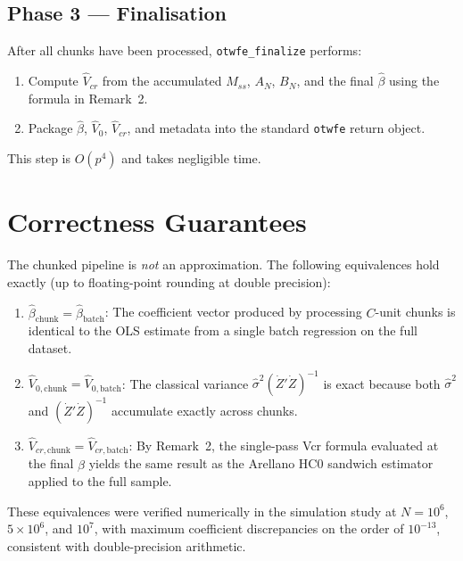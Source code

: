 \documentclass[11pt, a4paper]{article}
\begin{document}
\subsection{Phase 3 --- Finalisation}

After all chunks have been processed, \texttt{otwfe\_finalize} performs:
\begin{enumerate}
  \item Compute $\hat{V}_{cr}$ from the accumulated $M_{ss}$, $A_N$, $B_N$,
        and the final $\hat\beta$ using the formula in Remark~2.
  \item Package $\hat\beta$, $\hat{V}_0$, $\hat{V}_{cr}$, and metadata into
        the standard \texttt{otwfe} return object.
\end{enumerate}
This step is $O(p^4)$ and takes negligible time.

\section{Correctness Guarantees}

The chunked pipeline is \emph{not} an approximation.  The following
equivalences hold exactly (up to floating-point rounding at double precision):

\begin{enumerate}
  \item[(i)] $\hat\beta_{\mathrm{chunk}} = \hat\beta_{\mathrm{batch}}$:
        The coefficient vector produced by processing $C$-unit chunks is
        identical to the OLS estimate from a single batch regression on the
        full dataset.

  \item[(ii)] $\hat{V}_{0,\mathrm{chunk}} = \hat{V}_{0,\mathrm{batch}}$:
        The classical variance $\hat\sigma^2 (\dot{Z}'\dot{Z})^{-1}$ is exact
        because both $\hat\sigma^2$ and $(\dot{Z}'\dot{Z})^{-1}$ accumulate
        exactly across chunks.

  \item[(iii)] $\hat{V}_{cr,\mathrm{chunk}} = \hat{V}_{cr,\mathrm{batch}}$:
        By Remark~2, the single-pass Vcr formula evaluated at the final
        $\hat\beta$ yields the same result as the Arellano HC0 sandwich
        estimator applied to the full sample.
\end{enumerate}

These equivalences were verified numerically in the simulation study at
$N = 10^6$, $5 \times 10^6$, and $10^7$, with maximum coefficient discrepancies
on the order of $10^{-13}$, consistent with double-precision arithmetic.
\end{document}
